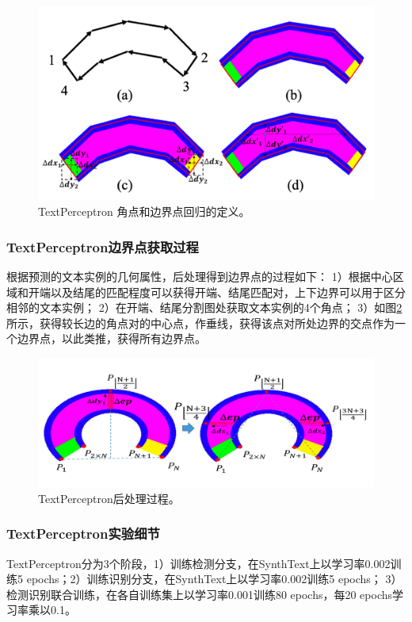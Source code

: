 \begin{figure}[htb]
    \centering
    \includegraphics[width=.8\textwidth]{figure/spotting/textperceptron_label.png} 
    \caption{TextPerceptron 角点和边界点回归的定义。} 
    \label{textperceptron_label} 
\end{figure}

\subsubsection{TextPerceptron边界点获取过程}
根据预测的文本实例的几何属性，后处理得到边界点的过程如下：
1）根据中心区域和开端以及结尾的匹配程度可以获得开端、结尾匹配对，上下边界可以用于区分相邻的文本实例；
2）在开端、结尾分割图处获取文本实例的4个角点；
3）如图\ref{textperceptron_process}所示，获得较长边的角点对的中心点，作垂线，获得该点对所处边界的交点作为一个边界点，以此类推，获得所有边界点。
\begin{figure}[htb]
    \centering
    \includegraphics[width=.8\textwidth]{figure/spotting/textperceptron_process.png} 
    \caption{TextPerceptron后处理过程。} 
    \label{textperceptron_process} 
\end{figure}

\subsubsection{TextPerceptron实验细节}
TextPerceptron分为3个阶段，1）训练检测分支，在SynthText上以学习率0.002训练5 epochs；2）训练识别分支，在SynthText上以学习率0.002训练5 epochs；
3）检测识别联合训练，在各自训练集上以学习率0.001训练80 epochs，每20 epochs学习率乘以0.1。


